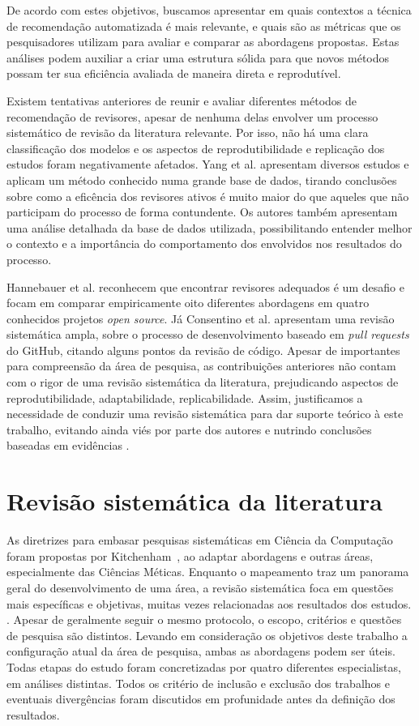 \documentclass[12pt,openany,oneside,a4paper,english,brazil]{abntbibufjf}
\begin{document}
De acordo com estes objetivos, buscamos apresentar em quais contextos a técnica de recomendação automatizada é mais relevante, e quais são as métricas que os pesquisadores utilizam para avaliar e comparar as abordagens propostas. Estas análises podem auxiliar a criar uma estrutura sólida para que novos métodos possam ter sua eficiência avaliada de maneira direta e reprodutível.

Existem tentativas anteriores de reunir e avaliar diferentes métodos de recomendação de revisores, apesar de nenhuma delas envolver um processo sistemático de revisão da literatura relevante. Por isso, não há uma clara classificação dos modelos e os aspectos de reprodutibilidade e replicação dos estudos foram negativamente afetados. Yang et al. \cite{yang2017} apresentam diversos estudos e aplicam um método conhecido numa grande base de dados, tirando conclusões sobre como a eficência dos revisores ativos é muito maior do que aqueles que não participam do processo de forma contundente. Os autores também apresentam uma análise detalhada da base de dados utilizada, possibilitando entender melhor o contexto e a importância do comportamento dos envolvidos nos resultados do processo.

Hannebauer et al. \cite{hannebauer2016} reconhecem que encontrar revisores adequados é um desafio e focam em comparar empiricamente oito diferentes abordagens em quatro conhecidos projetos \textit{open source}. Já Consentino et al. \cite{cosentino2017} apresentam uma revisão sistemática ampla, sobre o processo de desenvolvimento baseado em \textit{pull requests} do GitHub, citando alguns pontos da revisão de código. Apesar de importantes para compreensão da área de pesquisa, as contribuições anteriores não contam com o rigor de uma revisão sistemática da literatura, prejudicando aspectos de reprodutibilidade, adaptabilidade, replicabilidade. Assim, justificamos a necessidade de conduzir uma revisão sistemática para dar suporte teórico à este trabalho, evitando ainda viés por parte dos autores e nutrindo conclusões baseadas em evidências \cite{wohlin2012}.


\section{Revisão sistemática da literatura}\label{sec:revisao_sistematica}

As diretrizes para embasar pesquisas sistemáticas em Ciência da Computação foram propostas por Kitchenham~\cite{kitchenham2004}, ao adaptar abordagens e outras áreas, especialmente das Ciências Méticas. Enquanto o mapeamento traz um panorama geral do desenvolvimento de uma área, a revisão sistemática foca em questões mais específicas e objetivas, muitas vezes relacionadas aos resultados dos estudos. \cite{wohlin2012}. Apesar de geralmente seguir o mesmo protocolo, o escopo, critérios e questões de pesquisa são distintos. Levando em consideração os objetivos deste trabalho a configuração atual da área de pesquisa, ambas as abordagens podem ser úteis. Todas etapas do estudo foram concretizadas por quatro diferentes especialistas, em análises distintas. Todos os critério de inclusão e exclusão dos trabalhos e eventuais divergências foram discutidos em profunidade antes da definição dos resultados.
\end{document}
